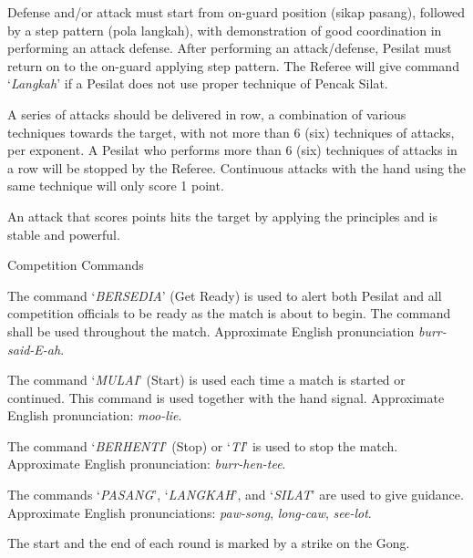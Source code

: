 \begin{legal}
\begin{legal}
\begin{legal}
 
        \item Defense and/or attack must start from on-guard position (sikap pasang),
        followed by a step pattern (pola langkah), with demonstration of good coordination in
        performing an attack defense.  After performing an attack/defense, Pesilat must return on to 
        the on-guard applying step pattern. The Referee will give command `\emph{Langkah}' if a Pesilat 
        does not use proper technique of Pencak Silat.
        \item A series of attacks should be delivered in row, a combination of various
        techniques towards the target, with not more than 6 (six) techniques of attacks, per
        exponent. A Pesilat who performs more than 6 (six) techniques of attacks in a row will
        be stopped by the Referee.  
        Continuous attacks with the hand using the same technique will only score 1 point.
        \item An attack that scores points hits the target by applying the principles and 
        is stable and powerful.
        \end{legal}

        \item Competition Commands
        \begin{legal}
        \item The command `\emph{BERSEDIA}' (Get Ready) is used to alert both Pesilat and 
        all competition officials to be ready as the match is about to begin. The command shall
        be used throughout the match.  Approximate English pronunciation \emph{burr-said-E-ah}.
        \item  The command `\emph{MULAI}' (Start) is used each time a match is started or continued.
This command is used together with the hand signal.  Approximate English pronunciation: \emph{moo-lie}.
        \item The command `\emph{BERHENTI}' (Stop) or `\emph{TI}' is used to stop the match.  Approximate English pronunciation: \emph{burr-hen-tee}.
        \item The commands `\emph{PASANG}', `\emph{LANGKAH}', and `\emph{SILAT}' are used to give guidance.  Approximate English pronunciations: \emph{paw-song}, \emph{long-caw}, \emph{see-lot}.
        \item The start and the end of each round is marked by a strike on the Gong.
        \end{legal}



\end{legal}
\end{legal}
